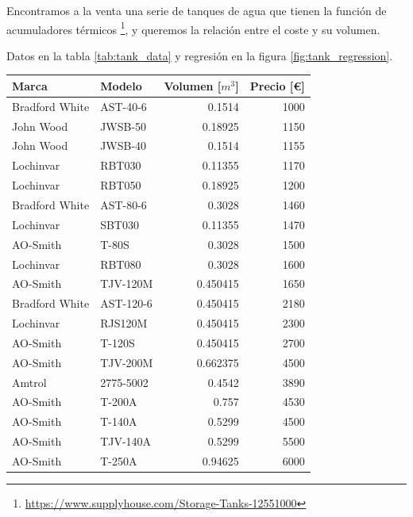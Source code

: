 Encontramos a la venta una serie de tanques de agua que tienen la función de
acumuladores térmicos
\footnote{\url{https://www.supplyhouse.com/Storage-Tanks-12551000}}, y queremos
la relación entre el coste y su volumen.

Datos en la tabla \ref{tab:tank_data} y regresión en la figura
\ref{fig:tank_regression}.

\begin{table}[htbp]
	\centering
	\begin{tabular}{llrr}
		\toprule
		Marca          & Modelo    & Volumen [$m^3$] & Precio [\euro] \\
		\midrule
		Bradford White & AST-40-6  & 0.1514          & 1000           \\
		John Wood      & JWSB-50   & 0.18925         & 1150           \\
		John Wood      & JWSB-40   & 0.1514          & 1155           \\
		Lochinvar      & RBT030    & 0.11355         & 1170           \\
		Lochinvar      & RBT050    & 0.18925         & 1200           \\
		Bradford White & AST-80-6  & 0.3028          & 1460           \\
		Lochinvar      & SBT030    & 0.11355         & 1470           \\
		AO-Smith       & T-80S     & 0.3028          & 1500           \\
		Lochinvar      & RBT080    & 0.3028          & 1600           \\
		AO-Smith       & TJV-120M  & 0.450415        & 1650           \\
		Bradford White & AST-120-6 & 0.450415        & 2180           \\
		Lochinvar      & RJS120M   & 0.450415        & 2300           \\
		AO-Smith       & T-120S    & 0.450415        & 2700           \\
		AO-Smith       & TJV-200M  & 0.662375        & 4500           \\
		Amtrol         & 2775-5002 & 0.4542          & 3890           \\
		AO-Smith       & T-200A    & 0.757           & 4530           \\
		AO-Smith       & T-140A    & 0.5299          & 4500           \\
		AO-Smith       & TJV-140A  & 0.5299          & 5500           \\
		AO-Smith       & T-250A    & 0.94625         & 6000           \\

\end{tabular}
\end{table}
